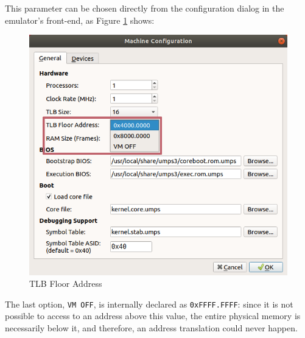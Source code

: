 \documentclass[12pt,a4paper,openright,twoside]{report}
\begin{document}
This parameter can be chosen directly from the configuration dialog in the emulator's front-end, as Figure \ref{fig:tlb_floor_address} shows:
\begin{figure}[h]
	\centering
	\includegraphics[scale=0.73]{tlb_floor_address}
	\caption{TLB Floor Address}
	\label{fig:tlb_floor_address}
\end{figure}

The last option, \texttt{VM OFF}, is internally declared as \texttt{0xFFFF.FFFF}: since it is not possible to access to an address above this value, the entire physical memory is necessarily below it, and therefore, an address translation could never happen.
\end{document}
